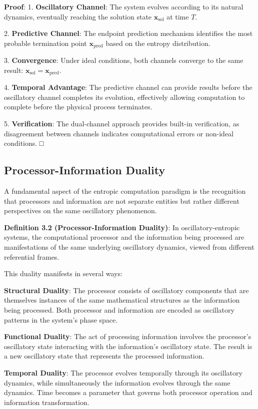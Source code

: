 \documentclass[12pt,a4paper]{article}
\theoremstyle{definition}
\begin{document}
\textbf{Proof}:
1. \textbf{Oscillatory Channel}: The system evolves according to its natural dynamics, eventually reaching the solution state $\mathbf{x}_{\text{sol}}$ at time $T$.

2. \textbf{Predictive Channel}: The endpoint prediction mechanism identifies the most probable termination point $\mathbf{x}_{\text{pred}}$ based on the entropy distribution.

3. \textbf{Convergence}: Under ideal conditions, both channels converge to the same result: $\mathbf{x}_{\text{sol}} = \mathbf{x}_{\text{pred}}$.

4. \textbf{Temporal Advantage}: The predictive channel can provide results before the oscillatory channel completes its evolution, effectively allowing computation to complete before the physical process terminates.

5. \textbf{Verification}: The dual-channel approach provides built-in verification, as disagreement between channels indicates computational errors or non-ideal conditions. □

\subsection{Processor-Information Duality}

A fundamental aspect of the entropic computation paradigm is the recognition that processors and information are not separate entities but rather different perspectives on the same oscillatory phenomenon.

\textbf{Definition 3.2 (Processor-Information Duality)}: In oscillatory-entropic systems, the computational processor and the information being processed are manifestations of the same underlying oscillatory dynamics, viewed from different referential frames.

This duality manifests in several ways:

\textbf{Structural Duality}: The processor consists of oscillatory components that are themselves instances of the same mathematical structures as the information being processed. Both processor and information are encoded as oscillatory patterns in the system's phase space.

\textbf{Functional Duality}: The act of processing information involves the processor's oscillatory state interacting with the information's oscillatory state. The result is a new oscillatory state that represents the processed information.

\textbf{Temporal Duality}: The processor evolves temporally through its oscillatory dynamics, while simultaneously the information evolves through the same dynamics. Time becomes a parameter that governs both processor operation and information transformation.
\end{document}
